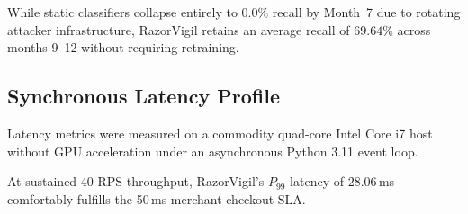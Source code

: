 \documentclass[conference]{IEEEtran}
\begin{document}
\begin{table}[h]
\caption{Temporal Drift Evaluation Across Months 9--12}
\setlength{\tabcolsep}{4pt}
\footnotesize
\label{tab:drift}
\centering\small
{}
\end{table}
While static classifiers collapse entirely to $0.0\%$ recall by Month~7 due to rotating attacker infrastructure, RazorVigil retains an average recall of $69.64\%$ across months 9--12 without requiring retraining.

\subsection{Synchronous Latency Profile}
Latency metrics were measured on a commodity quad-core Intel Core i7 host without GPU acceleration under an asynchronous Python 3.11 event loop.

\begin{table}[h]
\caption{Synchronous Latency Profiles vs. 50\,ms SLA}
\setlength{\tabcolsep}{2.5pt}
\footnotesize
\label{tab:latency}
\centering\small
{}
\end{table}
At sustained 40 RPS throughput, RazorVigil's $P_{99}$ latency of $28.06\,$ms comfortably fulfills the 50\,ms merchant checkout SLA.
\end{document}
